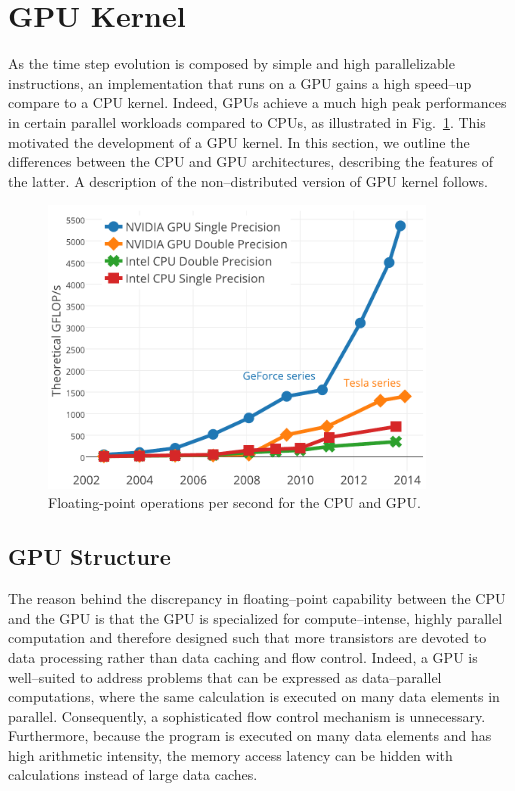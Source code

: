 \section{GPU Kernel}
As the time step evolution is composed by simple and high parallelizable instructions, an implementation that runs on a GPU gains a high speed--up compare to a CPU kernel. Indeed, GPUs achieve a much high peak performances in certain parallel workloads compared to CPUs, as illustrated in Fig.~\ref{fig:CPU-GPU-computational-power}. This motivated the development of a GPU kernel. In this section, we outline the differences between the CPU and GPU architectures, describing the features of the latter. A description of the non--distributed version of GPU kernel follows.
\begin{figure}
   \centering
   \includegraphics[width=10cm]{Figs/GPU-vs-CPU.pdf}
   \caption{Floating-point operations per second for the CPU and GPU.} \label{fig:CPU-GPU-computational-power}
\end{figure}

\subsection{GPU Structure}
The reason behind the discrepancy in floating--point capability between the CPU and the GPU is that the GPU is specialized for compute--intense, highly parallel computation and therefore designed such that more transistors are devoted to data processing rather than data caching and flow control. Indeed, a GPU is well--suited to address problems that can be expressed as data--parallel computations, where the same calculation is executed on many data elements in parallel. Consequently,  a sophisticated flow control mechanism is unnecessary. Furthermore, because the program is executed on many data elements and has high arithmetic intensity, the memory access latency can be hidden with calculations instead of large data caches.

